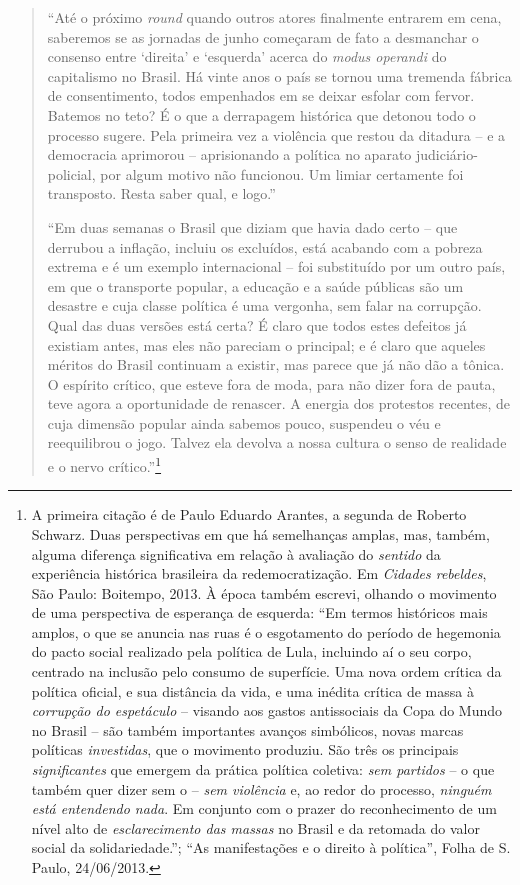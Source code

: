 \begin{quote}
``Até o próximo \emph{round} quando outros atores finalmente entrarem em
cena, saberemos se as jornadas de junho começaram de fato a desmanchar o
consenso entre `direita' e `esquerda' acerca do \emph{modus operandi} do
capitalismo no Brasil. Há vinte anos o país se tornou uma tremenda
fábrica de consentimento, todos empenhados em se deixar esfolar com
fervor. Batemos no teto? É o que a derrapagem histórica que detonou todo
o processo sugere. Pela primeira vez a violência que restou da ditadura
-- e a democracia aprimorou -- aprisionando a política no aparato
judiciário-policial, por algum motivo não funcionou. Um limiar
certamente foi transposto. Resta saber qual, e logo.''

\asterisc

``Em duas semanas o Brasil que diziam que havia dado certo -- que
derrubou a inflação, incluiu os excluídos, está acabando com a pobreza
extrema e é um exemplo internacional -- foi substituído por um outro
país, em que o transporte popular, a educação e a saúde públicas são um
desastre e cuja classe política é uma vergonha, sem falar na corrupção.
Qual das duas versões está certa? É claro que todos estes defeitos já
existiam antes, mas eles não pareciam o principal; e é claro que aqueles
méritos do Brasil continuam a existir, mas parece que já não dão a
tônica. O espírito crítico, que esteve fora de moda, para não dizer fora
de pauta, teve agora a oportunidade de renascer. A energia dos protestos
recentes, de cuja dimensão popular ainda sabemos pouco, suspendeu o véu
e reequilibrou o jogo. Talvez ela devolva a nossa cultura o senso de
realidade e o nervo crítico.''\footnote{A primeira citação é de Paulo
  Eduardo Arantes, a segunda de Roberto Schwarz. Duas perspectivas em
  que há semelhanças amplas, mas, também, alguma diferença significativa
  em relação à avaliação do \emph{sentido} da experiência histórica
  brasileira da redemocratização. Em \emph{Cidades rebeldes}, São Paulo:
  Boitempo, 2013. À época também escrevi, olhando o movimento de uma
  perspectiva de esperança de esquerda: ``Em termos históricos mais
  amplos, o que se anuncia nas ruas é o esgotamento do período de
  hegemonia do pacto social realizado pela política de Lula, incluindo
  aí o seu corpo, centrado na inclusão pelo consumo de superfície. Uma
  nova ordem crítica da política oficial, e sua distância da vida, e uma
  inédita crítica de massa à \emph{corrupção do espetáculo} -- visando
  aos gastos antissociais da Copa do Mundo no Brasil -- são também
  importantes avanços simbólicos, novas marcas políticas
  \emph{investidas}, que o movimento produziu. São três os principais
  \emph{significantes} que emergem da prática política coletiva:
  \emph{sem partidos} -- o que também quer dizer sem o  -- \emph{sem
  violência} e, ao redor do processo, \emph{ninguém está entendendo
  nada}. Em conjunto com o prazer do reconhecimento de um nível alto de
  \emph{esclarecimento das massas} no Brasil e da retomada do valor
  social da solidariedade.''; ``As manifestações e o direito à
  política'', Folha de S. Paulo, 24/06/2013.}
\end{quote}

